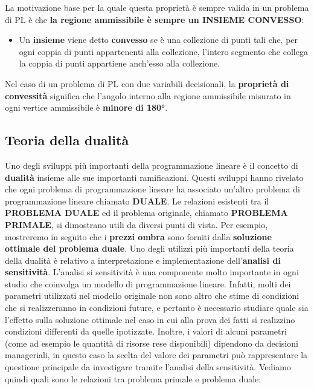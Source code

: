 \documentclass[12pt]{article}
\begin{document}
\begin{itemize}
    La motivazione base per la quale questa proprietà è sempre valida in un problema di PL è che \textbf{la regione ammissibile è sempre un INSIEME CONVESSO}:
    \begin{itemize}
        \item Un \textbf{insieme} viene detto \textbf{convesso} se è una collezione di punti tali che, per ogni coppia di punti appartenenti alla collezione, l'intero segmento che collega la coppia di punti appartiene anch'esso alla collezione.
    \end{itemize}
    Nel caso di un problema di PL con due variabili decisionali, la \textbf{proprietà di convessità} significa che l'angolo interno alla regione ammissibile misurato in ogni vertice ammissibile è \textbf{minore di 180°}.
\end{itemize}
\subsection{Teoria della dualità}
Uno degli sviluppi più importanti della programmazione lineare è il concetto di \textbf{dualità} insieme alle sue importanti ramificazioni.
Questi sviluppi hanno rivelato che ogni problema di programmazione lineare ha associato un'altro problema di programmazione lineare chiamato \textbf{DUALE}.
Le relazioni esistenti tra il \textbf{PROBLEMA DUALE} ed il problema originale, chiamato \textbf{PROBLEMA PRIMALE}, si dimostrano utili da diversi punti di vista.
Per esempio, mostreremo in seguito che i \textbf{prezzi ombra} sono forniti dalla \textbf{soluzione ottimale del problema duale}.
Uno degli utilizzi più importanti della teoria della dualità è relativo a interpretazione e implementazione dell'\textbf{analisi di sensitività}.
L'analisi si sensitività è una componente molto importante in ogni studio che coinvolga un modello di programmazione lineare.
Infatti, molti dei parametri utilizzati nel modello originale non sono altro che stime di condizioni che si realizzeranno in condizioni future, e pertanto è necessario studiare quale sia l'effetto
sulla soluzione ottimale nel caso in cui alla prova dei fatti si realizzino condizioni differenti da quelle ipotizzate.
Inoltre, i valori di alcuni parametri (come ad esempio le quantità di risorse rese disponibili) dipendono da decisioni manageriali, in questo caso la scelta del valore dei parametri può rappresentare la questione principale da investigare tramite l'analisi della sensitività.
Vediamo quindi quali sono le relazioni tra problema primale e problema duale:
\begin{center}
    \noindent
\end{center}
\end{document}
